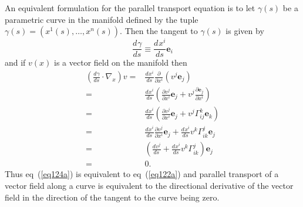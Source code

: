 \documentclass[12pt,twoside,openright]{memoir}
\newcommand{\bm}[1]{\boldsymbol{#1}}
\newcommand{\bfrac}[2]{\displaystyle\frac{#1}{#2}}
\newcommand{\lp}{\left (}
\newcommand{\rp}{\right )}
\newcommand{\pdiff}[2]{\bfrac{\partial {#1}}{\partial {#2}}}
\newcommand{\f}[2]{{#1}\lp {#2} \rp}
\newcommand{\paren}[1]{\lp {#1} \rp}
\newcommand{\deriv}[3]{\bfrac{d^{#3}#1}{d{#2}^{#3}}}
\newcommand{\be}{\begin{equation}}
\newcommand{\ee}{\end{equation}}
\newcommand{\eb}{\bm{e}}
\begin{document}
An equivalent formulation for the parallel transport equation is to let $\f{\gamma}{s}$ be a parametric curve in the manifold
defined by the tuple $\f{\gamma}{s} = \paren{\f{x^{1}}{s},\dots,\f{x^{n}}{s}}$.  Then the tangent to $\f{\gamma}{s}$ is given by
\be
	\deriv{\gamma}{s}{} \equiv \deriv{x^{i}}{s}{}\eb_{i}
\ee
and if $\f{v}{x}$ is a vector field on the manifold then
\begin{align}
	\paren{\deriv{\gamma}{s}{}\cdot\nabla_{x}}v =& \deriv{x^{i}}{s}{}\pdiff{}{x^{i}}\paren{v^{j}\eb_{j}} \nonumber \\
	     =&\deriv{x^{i}}{s}{}\paren{\pdiff{v^{j}}{x^{i}}\eb_{j}+v^{j}\pdiff{\eb_{j}}{x^{i}}} \nonumber \\
	     =&\deriv{x^{i}}{s}{}\paren{\pdiff{v^{j}}{x^{i}}\eb_{j}+v^{j}\Gamma^{k}_{ij}\eb_{k}} \nonumber \\
	     =&\deriv{x^{i}}{s}{}\pdiff{v^{j}}{x^{i}}\eb_{j}+\deriv{x^{i}}{s}{}v^{k}\Gamma^{j}_{ik}\eb_{j} \nonumber \\
	     =&\paren{\deriv{v^{j}}{s}{}+\deriv{x^{i}}{s}{}v^{k}\Gamma^{j}_{ik}}\eb_{j} \nonumber \\
	     =& 0. \label{eq124a}
\end{align}
Thus eq~(\ref{eq124a}) is equivalent to eq~(\ref{eq122a}) and parallel transport of a vector field along a curve is 
equivalent to the directional derivative of the vector field in the direction of the tangent to the curve being zero.  
\end{document}
